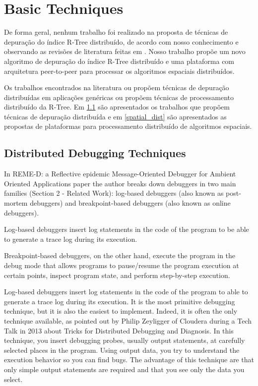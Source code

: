 \section{Basic Techniques}
\label{sec:debug_tec}

De forma geral, nenhum trabalho foi realizado na proposta de técnicas de depuração do índice R-Tree distribuído, de acordo com nosso conhecimento e observando as revisões de literatura feitas em \cite{manolopoulos2003rth,jacox2007spatial}.
Nosso trabalho propõe um novo algoritmo de depuração do índice R-Tree distribuído e uma plataforma com arquitetura peer-to-peer para processar os algoritmos espaciais distribuídos.

Os trabalhos encontrados na literatura ou propõem técnicas de depuração distribuídas em aplicações genéricas ou propõem técnicas de processamento distribuído da R-Tree. Em \ref{dist_debug} são apresentados os trabalhos que propõem técnicas de depuração distribuída e em \ref{spatial_dist} são apresentados as propostas de plataformas para processamento distribuído de algoritmos espaciais.
	
\subsection{Distributed Debugging Techniques}
\label{dist_debug}

In REME-D: a Reflective epidemic Message-Oriented Debugger for Ambient Oriented Applications paper the author breaks down debuggers in two main families (Section 2 - Related Work): log-based debuggers (also known as post-mortem debuggers) and breakpoint-based debuggers (also known as online debuggers).

	Log-based debuggers insert log statements in the code of the program to be able to generate a trace log during its execution.
	
	Breakpoint-based debuggers, on the other hand, execute the program in the debug mode that allows programs to pause/resume the program execution at certain points, inspect program state, and perform step-by-step execution.

	Log-based debuggers insert log statements in the code of the program to able to generate a trace log during its execution. It is the most primitive debugging technique, but it is also the easiest to implement. Indeed, it is often the only technique available, as pointed out by Philip Zeyligger of Cloudera during a Tech Talk in 2013 about Tricks for Distributed Debugging and Diagnosis. In this technique, you insert debugging probes, usually output statements, at carefully selected places in the program. Using output data, you try to understand the execution behavior so you can find bugs. The advantage of this technique are that only simple output statements are required and that you see only the data you select.
	
